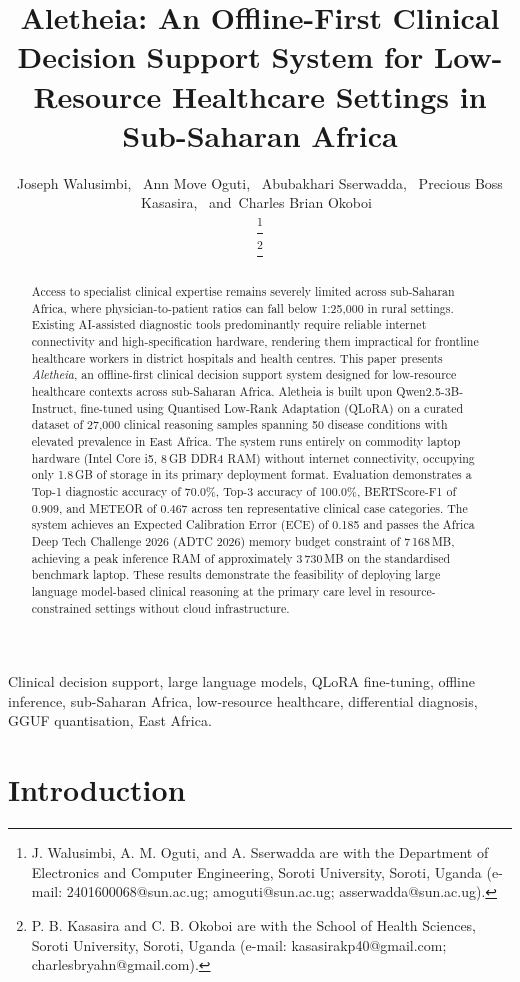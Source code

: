 \documentclass[journal]{IEEEtran}
\title{Aletheia: An Offline-First Clinical Decision Support System
for Low-Resource Healthcare Settings in Sub-Saharan Africa}
\author{Joseph Walusimbi,~\IEEEmembership{}
  Ann Move Oguti,~\IEEEmembership{}
  Abubakhari Sserwadda,~\IEEEmembership{}
  Precious Boss Kasasira,~\IEEEmembership{}
  and~Charles Brian Okoboi~\IEEEmembership{}

\thanks{J. Walusimbi, A. M. Oguti, and A. Sserwadda are with the
Department of Electronics and Computer Engineering, Soroti University,
Soroti, Uganda (e-mail: 2401600068@sun.ac.ug; amoguti@sun.ac.ug;
asserwadda@sun.ac.ug).}

\thanks{P. B. Kasasira and C. B. Okoboi are with the School of Health
Sciences, Soroti University, Soroti, Uganda
(e-mail: kasasirakp40@gmail.com; charlesbryahn@gmail.com).}}
\begin{document}
\maketitle

\begin{abstract}
Access to specialist clinical expertise remains severely limited
across sub-Saharan Africa, where physician-to-patient ratios can
fall below 1:25{,}000 in rural settings. Existing AI-assisted
diagnostic tools predominantly require reliable internet connectivity
and high-specification hardware, rendering them impractical for
frontline healthcare workers in district hospitals and health
centres. This paper presents \textit{Aletheia}, an offline-first
clinical decision support system designed for low-resource
healthcare contexts across sub-Saharan Africa. Aletheia is built
upon Qwen2.5-3B-Instruct, fine-tuned using Quantised Low-Rank
Adaptation (QLoRA) on a curated dataset of 27{,}000 clinical
reasoning samples spanning 50 disease conditions with elevated
prevalence in East Africa. The system runs entirely on commodity
laptop hardware (Intel Core i5, 8\,GB DDR4 RAM) without internet
connectivity, occupying only 1.8\,GB of storage in its primary
deployment format. Evaluation demonstrates a Top-1 diagnostic
accuracy of 70.0\%, Top-3 accuracy of 100.0\%, BERTScore-F1 of
0.909, and METEOR of 0.467 across ten representative clinical case
categories. The system achieves an Expected Calibration Error (ECE)
of 0.185 and passes the Africa Deep Tech Challenge 2026 (ADTC 2026)
memory budget constraint of 7\,168\,MB, achieving
a peak inference RAM of approximately 3\,730\,MB on the standardised
benchmark laptop. These results demonstrate the
feasibility of deploying large language model-based clinical
reasoning at the primary care level in resource-constrained settings
without cloud infrastructure.
\end{abstract}

\begin{IEEEkeywords}
Clinical decision support, large language models, QLoRA fine-tuning,
offline inference, sub-Saharan Africa, low-resource healthcare,
differential diagnosis, GGUF quantisation, East Africa.
\end{IEEEkeywords}

\section{Introduction}
\label{sec:intro}
\end{document}
